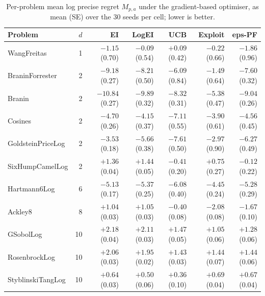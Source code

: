 \begin{table}[t]
\centering
\caption{Per-problem mean log precise regret $M_{p,a}$ under the gradient-based optimiser, as mean (SE) over the 30 seeds per cell; lower is better.}
\label{tab:appd-mpa-grad}
\footnotesize
\begin{tabular}{lrrrrrr}
\toprule
Problem & $d$ & EI & LogEI & UCB & Exploit & eps-PF \\
\midrule
WangFreitas & 1 & $-1.15$ (0.70) & $-0.09$ (0.54) & $+0.09$ (0.42) & $-0.22$ (0.66) & $-1.86$ (0.96) \\
BraninForrester & 2 & $-9.18$ (0.27) & $-8.21$ (0.50) & $-6.09$ (0.84) & $-1.49$ (0.64) & $-7.60$ (0.32) \\
Branin & 2 & $-10.84$ (0.27) & $-9.89$ (0.32) & $-8.32$ (0.31) & $-5.38$ (0.47) & $-9.04$ (0.26) \\
Cosines & 2 & $-4.70$ (0.26) & $-4.15$ (0.37) & $-7.11$ (0.55) & $-3.90$ (0.61) & $-4.56$ (0.45) \\
GoldsteinPriceLog & 2 & $-3.53$ (0.18) & $-5.66$ (0.38) & $-7.61$ (0.50) & $-2.97$ (0.90) & $-6.27$ (0.49) \\
SixHumpCamelLog & 2 & $+1.36$ (0.04) & $+1.44$ (0.05) & $-0.41$ (0.20) & $+0.75$ (0.27) & $-0.12$ (0.22) \\
Hartmann6Log & 6 & $-5.13$ (0.17) & $-5.37$ (0.25) & $-6.08$ (0.40) & $-4.45$ (0.24) & $-5.28$ (0.29) \\
Ackley8 & 8 & $+1.04$ (0.03) & $+1.05$ (0.03) & $-0.40$ (0.08) & $-2.08$ (0.08) & $-1.67$ (0.10) \\
GSobolLog & 10 & $+2.18$ (0.04) & $+2.11$ (0.03) & $+1.47$ (0.05) & $+1.05$ (0.06) & $+1.28$ (0.06) \\
RosenbrockLog & 10 & $+2.06$ (0.03) & $+1.95$ (0.02) & $+1.43$ (0.03) & $+1.44$ (0.07) & $+1.44$ (0.06) \\
StyblinskiTangLog & 10 & $+0.64$ (0.03) & $+0.50$ (0.06) & $+0.36$ (0.10) & $+0.69$ (0.04) & $+0.67$ (0.04) \\
\bottomrule
\end{tabular}
\end{table}

